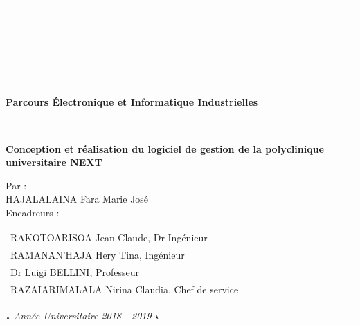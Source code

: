 \documentclass[12pt,a4paper]{report}
\begin{document}
\begin{titlepage}
{\begin{center}
 		\end{center}			
 	}\\
 	\vspace*{-0.7 cm}
 	\centering\parbox{\textwidth}{
 		\begin{center}
 			\color{black}\rule{\textwidth}{0.5pt}\\
 			\vspace*{-0.38 cm}
 			\rule{\textwidth}{1.5pt}\\	
 		\end{center}			
 	}\\
 	\centering\parbox{\textwidth}{
 		\begin{center}		
 			\large\textbf{Parcours Électronique et Informatique Industrielles} \\			
 		\end{center}			
 	}\\
 	\vfill
 	\parbox{\textwidth}{
 		\begin{center}
 			\vspace{0.5 cm}
 			{\Huge \color[rgb]{0,0,1} \bfseries{Conception et réalisation du logiciel de gestion de la polyclinique universitaire NEXT
 			}} \\
 		\end{center}
 	}
 	\vfill
 	
 	\parbox{\textwidth}{
 		\begin{center}
 			\large{Par :}  \\
 			\vspace{0.3 cm}
 			\large{HAJALALAINA Fara Marie José} \\
 			\vspace*{1 cm}
 			\large{Encadreurs :}\\
 			\vspace{0.3 cm}
 			\begin{tabular}{ll}						 
				\normalsize	RAKOTOARISOA Jean Claude, Dr Ingénieur\\
				\normalsize	RAMANAN’HAJA Hery Tina, Ingénieur\\
				\normalsize	Dr Luigi BELLINI, Professeur\\
				\normalsize	RAZAIARIMALALA Nirina Claudia, Chef de service\\		 							
 			\end{tabular}
 		\end{center}
 	}
 	
 	\parbox{\textwidth}{
 		\begin{center}
 			$\star$
 			\centering\textit{Année Universitaire 2018 - 2019} $\star$ \\
 		\end{center}
 	}
 \end{titlepage}

\restoregeometry 
\end{document}
